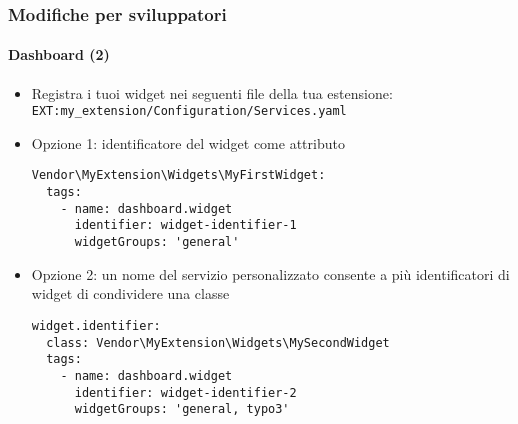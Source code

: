 
\begin{frame}[fragile]
	\frametitle{Modifiche per sviluppatori}
	\framesubtitle{Dashboard (2)}

	\lstset{basicstyle=\tiny\ttfamily}

	\begin{itemize}
		\item Registra i tuoi widget nei seguenti file della tua estensione:\newline
			\texttt{EXT:my\_extension/Configuration/Services.yaml}

		\item Opzione 1: identificatore del widget come attributo

\vspace{-0.4cm}
\begin{lstlisting}
Vendor\MyExtension\Widgets\MyFirstWidget:
  tags:
    - name: dashboard.widget
      identifier: widget-identifier-1
      widgetGroups: 'general'
\end{lstlisting}

		\item Opzione 2: un nome del servizio personalizzato consente a più identificatori di widget di condividere una classe

\vspace{-0.4cm}
\begin{lstlisting}
widget.identifier:
  class: Vendor\MyExtension\Widgets\MySecondWidget
  tags:
    - name: dashboard.widget
      identifier: widget-identifier-2
      widgetGroups: 'general, typo3'
\end{lstlisting}

	\end{itemize}

\end{frame}


